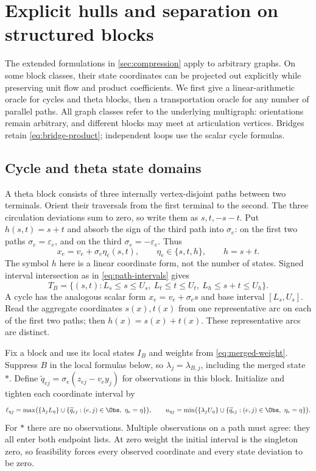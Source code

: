 \section{Explicit hulls and separation on structured blocks}\label{sec:structured-oracles}
The extended formulations in \cref{sec:compression} apply to arbitrary
graphs. On some block classes, their state coordinates can be projected
out explicitly while preserving unit flow and product coefficients. We
first give a linear-arithmetic oracle for cycles and theta blocks, then a
transportation oracle for any number of parallel paths. All graph classes
refer to the underlying multigraph: orientations remain arbitrary, and
different blocks may meet at articulation vertices. Bridges retain
\eqref{eq:bridge-product}; independent loops use the scalar cycle formulas.

\subsection{Cycle and theta state domains}\label{subsec:theta-domains}
A theta block consists of three internally vertex-disjoint paths between
two terminals. Orient their traversals from the first terminal to the
second. The three circulation deviations sum to zero, so write them as
$s,t,-s-t$. Put $h(s,t)=s+t$ and absorb the sign of the third path into
$\sigma_e$: on the first two paths $\sigma_e=\varepsilon_e$, and on the
third $\sigma_e=-\varepsilon_e$. Thus
\begin{equation}\label{eq:theta-arc-form}
 x_e=v_e+\sigma_e\eta_e(s,t),\qquad
 \eta_e\in\{s,t,h\},\qquad h=s+t.
\end{equation}
The symbol $h$ here is a linear coordinate form, not the number of states.
Signed interval intersection as in \eqref{eq:path-intervals} gives
\begin{equation}\label{eq:theta-base}
 T_B=\{(s,t):L_s\le s\le U_s,\ L_t\le t\le U_t,
                       \ L_h\le s+t\le U_h\}.
\end{equation}
A cycle has the analogous scalar form $x_e=v_e+\sigma_es$ and base
interval $[L_s,U_s]$. Read the aggregate coordinates $s(x),t(x)$ from
one representative arc on each of the first two paths; then
$h(x)=s(x)+t(x)$. These representative arcs are distinct.

Fix a block and use its local states $I_B$ and weights from
\eqref{eq:merged-weight}. Suppress $B$ in the local formulas below, so
$\lambda_j=\lambda_{B,j}$, including the merged state $*$. Define
$\widetilde q_{ej}=\sigma_e(z_{ej}-v_ey_j)$ for observations in this
block. Initialize and tighten each coordinate interval by
\begin{equation}\label{eq:theta-tightened-intervals}
 \ell_{\eta j}=\max\bigl(\{\lambda_jL_\eta\}\cup
        \{\widetilde q_{ej}:(e,j)\in\Obs,\ \eta_e=\eta\}\bigr),\qquad
 u_{\eta j}=\min\bigl(\{\lambda_jU_\eta\}\cup
        \{\widetilde q_{ej}:(e,j)\in\Obs,\ \eta_e=\eta\}\bigr).
\end{equation}
For $*$ there are no observations. Multiple observations on a path must
agree: they all enter both endpoint lists. At zero weight the initial
interval is the singleton zero, so feasibility forces every observed
coordinate and every state deviation to be zero.

